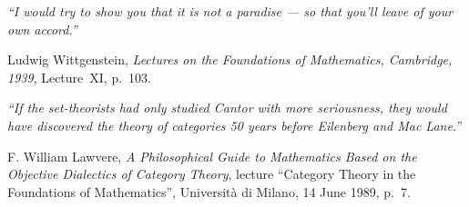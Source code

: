 \cleardoublepage
\thispagestyle{empty}
\vspace*{0.18\textheight}

\begin{flushright}
    \begin{minipage}{0.72\textwidth}
        \raggedleft
        \itshape
        \enquote{I would try to show you that it is not a paradise --- so that you'll leave of your own accord.}

        \medskip
        {\small\upshape Ludwig Wittgenstein, \textit{Lectures on the Foundations of Mathematics, Cambridge, 1939}, Lecture~XI, p.~103.}
    \end{minipage}
\end{flushright}

\vspace{2.5cm}

\begin{flushright}
    \begin{minipage}{0.72\textwidth}
        \raggedleft
        \itshape
        \enquote{If the set-theorists had only studied Cantor with more seriousness, they would have discovered the theory of categories 50 years before Eilenberg and Mac Lane.}

        \medskip
        {\small\upshape F. William Lawvere, \textit{A Philosophical Guide to Mathematics Based on the Objective Dialectics of Category Theory}, lecture \enquote{Category Theory in the Foundations of Mathematics}, Universit\`a di Milano, 14 June 1989, p.~7.}
    \end{minipage}
\end{flushright}

\vfill
